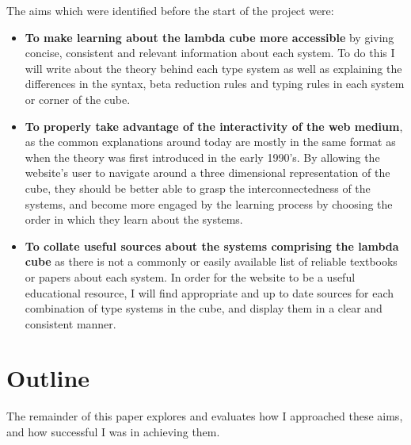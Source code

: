 \documentclass{l4proj}
\begin{document}
The aims which were identified before the start of the project were: 
\begin{itemize}
    \item
    \textbf{To make learning about the lambda cube more accessible} by giving concise, consistent and relevant information about each system.  To do this I will write about the theory behind each type system as well as explaining the differences in the syntax, beta reduction rules and typing rules in each system or corner of the cube.

    \item
    \textbf{To properly take advantage of the interactivity of the web medium}, as the common explanations around today are mostly in the same format as when the theory was first introduced in the early 1990's.  By allowing the website's user to navigate around a three dimensional representation of the cube, they should be better able to grasp the interconnectedness of the systems, and become more engaged by the learning process by choosing the order in which they learn about the systems.

    \item
    \textbf{To collate useful sources about the systems comprising the lambda cube} as there is not a commonly or easily available list of reliable textbooks or papers about each system.  In order for the website to be a useful educational resource, I will find appropriate and up to date sources for each combination of type systems in the cube, and display them in a clear and consistent manner.
\end{itemize}

\section{Outline}

The remainder of this paper explores and evaluates how I approached these aims, and how successful I was in achieving them.
\end{document}
